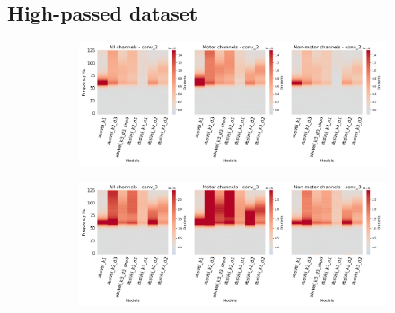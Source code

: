 \clearpage
\subsection*{High-passed dataset}\label{subsec:absVel-high-passed-dataset-appendixB}
\begin{figure}[!htpb]
\centering
\begin{subfigure}[b]{\textwidth}
   \includegraphics[width=1\linewidth]{img/appendix/A/conv-2/hp-sm/absVel-model-gradients_all_kinds}
   \caption{}
   \label{fig:absVel-hp-shifted-grads-conv-2}
\end{subfigure}

\begin{subfigure}[b]{\textwidth}
   \includegraphics[width=1\linewidth]{img/appendix/A/conv-3/hp-sm/absVel-model-gradients_all_kinds}
   \caption{}
   \label{fig:absVel-hp-shifted-grads-conv-3}
\end{subfigure}
\end{figure}
\clearpage   

